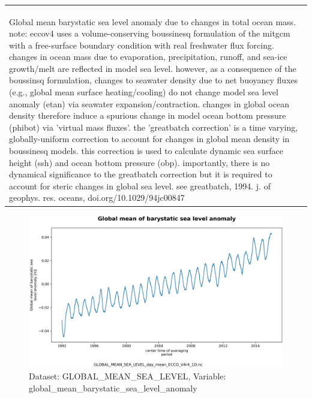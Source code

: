 \begin{longtable}{|m{}|m{}|m{}|m{}|}
{{{{{\hspace*{0.5cm}global\_mean\_barystatic\_sea\_level\_anomaly: valid\_min = -0.045110904\\
}}}}} \\ \hline
\rowcolor{lightgray} \multicolumn{4}{|c|}{\textbf{Comments}} \\ \hline
\multicolumn{4}{|p{1\textwidth}|}{\footnotesize{{Global mean barystatic sea level anomaly due to changes in total ocean mass. note: eccov4 uses a volume-conserving boussinesq formulation of the mitgcm with a free-surface boundary condition with real freshwater flux forcing. changes in ocean mass due to evaporation, precipitation, runoff, and sea-ice growth/melt are reflected in model sea level. however, as a consequence of the boussinsq formulation, changes to seawater density due to net buoyancy fluxes (e.g., global mean surface heating/cooling) do not change model sea level anomaly (etan) via seawater expansion/contraction. changes in global ocean density therefore induce a spurious change in model ocean bottom pressure (phibot) via 'virtual mass fluxes'. the 'greatbatch correction' is a time varying, globally-uniform correction to account for changes in global mean density in boussinesq models. this correction is used to calculate dynamic sea surface height (ssh) and ocean bottom pressure (obp). importantly, there is no dynamical significance to the greatbatch correction but it is required to account for steric changes in global sea level. see greatbatch, 1994. j. of geophys. res. oceans, doi.org/10.1029/94jc00847}}} \\ \hline
\end{longtable}

\begin{figure}[H]
\centering
\includegraphics[scale=0.55]{../images/plots/v4r4/oneD_plots/Global_Mean_Sea_Level/global_mean_barystatic_sea_level_anomaly.png}
\caption{Dataset: GLOBAL\_MEAN\_SEA\_LEVEL, Variable: global\_mean\_barystatic\_sea\_level\_anomaly}
\label{tab:table-GLOBAL_MEAN_SEA_LEVEL_global_mean_barystatic_sea_level_anomaly-Plot}
\end{figure}
\newpage
\pagebreak
